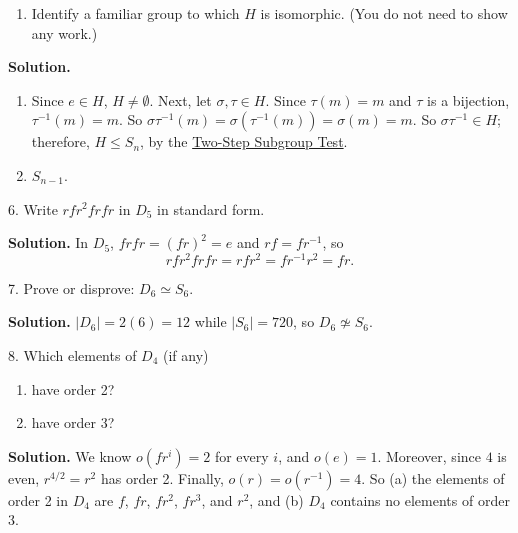 \documentclass[10pt,]{book}
\theoremstyle{plain}
\theoremstyle{definition}
\theoremstyle{definition}
\theoremstyle{definition}
\theoremstyle{definition}
\numberwithin{equation}{section}
\begin{document}
\begin{exerciselist}
\begin{enumerate}[label=(\alph*)]
\item\hypertarget{li-380}{}Identify a familiar group to which \(H\) is isomorphic. (You do not need to show any work.)%
\end{enumerate}
%
\par\smallskip
\par\smallskip
\noindent\textbf{Solution.}\hypertarget{solution-45}{}\quad
\leavevmode%
\begin{enumerate}[label=(\alph*)]
\item\hypertarget{li-381}{}Since \(e\in H\), \(H\neq \emptyset\).  Next, let \(\sigma, \tau\in H\).  Since \(\tau(m)=m\) and \(\tau\) is a bijection, \(\tau^{-1}(m)=m\).  So \(\sigma \tau^{-1}(m)=\sigma(\tau^{-1}(m))=\sigma(m)=m\).  So \(\sigma \tau^{-1}\in H\); therefore, \(H\leq S_n\), by the \hyperref[twostep]{Two-Step Subgroup Test}.%
\item\hypertarget{li-382}{}\(S_{n-1}\).%
\end{enumerate}
\item[6.]\hypertarget{exercise-46}{}Write \(rfr^2frfr\) in \(D_5\) in standard form.%
\par\smallskip
\par\smallskip
\noindent\textbf{Solution.}\hypertarget{solution-46}{}\quad
In \(D_5\), \(frfr=(fr)^2=e\) and \(rf=fr^{-1}\), so%
\begin{equation*}
rfr^2frfr=rfr^2=fr^{-1}r^2=fr.
\end{equation*}
%
\item[7.]\hypertarget{exercise-47}{}Prove or disprove: \(D_6\simeq S_6\).%
\par\smallskip
\par\smallskip
\noindent\textbf{Solution.}\hypertarget{solution-47}{}\quad
\(|D_6|=2(6)=12\) while \(|S_6|=720\), so \(D_6\not\simeq S_6\).%
\item[8.]\hypertarget{exercise-48}{}Which elements of \(D_4\) (if any) \leavevmode%
\begin{enumerate}[label=(\alph*)]
\item\hypertarget{li-383}{}have order 2?%
\item\hypertarget{li-384}{}have order \(3\)?%
\end{enumerate}
%
\par\smallskip
\par\smallskip
\noindent\textbf{Solution.}\hypertarget{solution-48}{}\quad
We know \(o(fr^i)=2\) for every \(i\), and \(o(e)=1\). Moreover, since \(4\) is even, \(r^{4/2}=r^2\) has order 2. Finally, \(o(r)=o(r^{-1})=4\). So (a) the elements of order 2 in \(D_4\) are \(f\), \(fr\), \(fr^2\), \(fr^3\), and \(r^2\), and (b) \(D_4\) contains no elements of order 3.%

\end{exerciselist}
\end{document}
